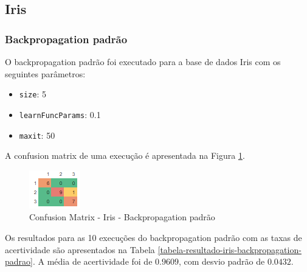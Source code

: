 \subsection{Iris}

\subsubsection{Backpropagation padrão}

O backpropagation padrão foi executado para a base de dados Iris com os seguintes parâmetros:

\begin{itemize}
	\item \texttt{size}: 5
	\item \texttt{learnFuncParams}: 0.1
	\item \texttt{maxit}: 50
\end{itemize}

A confusion matrix de uma execução é apresentada na Figura \ref{figura-confusion-matrix-iris-backpropagation-padrao}.

\begin{figure}[h!]
  \centering
  \includegraphics[width=0.3\linewidth]{figs/confusion-matrix-iris-backpropagation-padrao.png}
  \caption{Confusion Matrix - Iris - Backpropagation padrão}
  \label{figura-confusion-matrix-iris-backpropagation-padrao}
\end{figure}

Os resultados para as 10 execuções do backpropagation padrão com as taxas de acertividade são apresentados na Tabela \ref{tabela-resultado-iris-backpropagation-padrao}. A média de acertividade foi de $0.9609$, com desvio padrão de $0.0432$.

